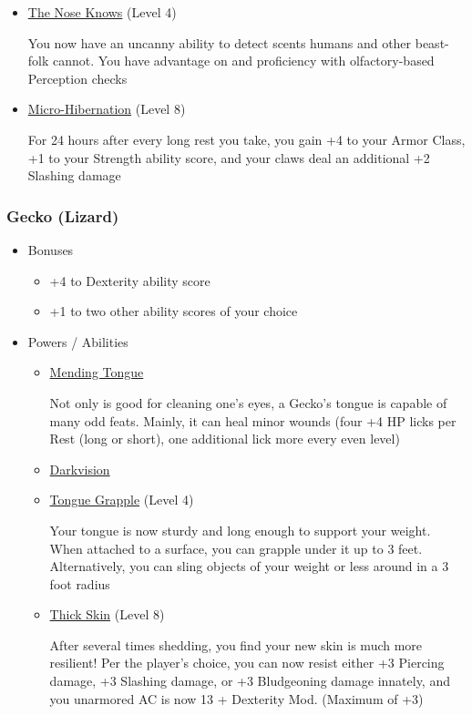 \documentclass[12pt, landscape]{article}
\begin{document}
\begin{FlushLeft}
\begin{multicols}{2}
\begin{itemize}
\begin{itemize}
					\item \underline{The Nose Knows} (Level 4)

					You now have an uncanny ability to detect scents humans and other beast-folk cannot.
					You have advantage on and proficiency with olfactory-based Perception checks
					\item \underline{Micro-Hibernation} (Level 8)

					For 24 hours after every long rest you take, you gain +4 to your Armor Class, +1 to your Strength ability score, and your claws deal an additional +2 Slashing damage
				\end{itemize}
			\end{itemize}
			\vfill \null \columnbreak

			\subsubsection{Gecko (Lizard)}
			\begin{itemize}
				\item Bonuses
				\begin{itemize}
					\item +4 to Dexterity ability score
					\item +1 to two other ability scores of your choice
				\end{itemize}
				\item Powers / Abilities
				\begin{itemize}
					\item \underline{Mending Tongue}

						Not only is good for cleaning one's eyes, a Gecko’s tongue is capable of many odd feats.
						Mainly, it can heal minor wounds (four +4 HP licks per Rest (long or short), one additional lick more every even level)
					\item \underline{Darkvision}
					\item \underline{Tongue Grapple} (Level 4)

					Your tongue is now sturdy and long enough to support your weight. When attached to a surface, you can grapple under it up to 3 feet.
					Alternatively, you can sling objects of your weight or less around in a 3 foot radius
					\item \underline{Thick Skin} (Level 8)

					After several times shedding, you find your new skin is much more resilient!
					Per the player’s choice, you can now resist either +3 Piercing damage, +3 Slashing damage, or +3 Bludgeoning damage innately, and you unarmored AC is now 13 + Dexterity Mod. (Maximum of +3)
				\end{itemize}
			\end{itemize}
			\vfill \pagebreak


\end{multicols}
\end{FlushLeft}
\end{document}
